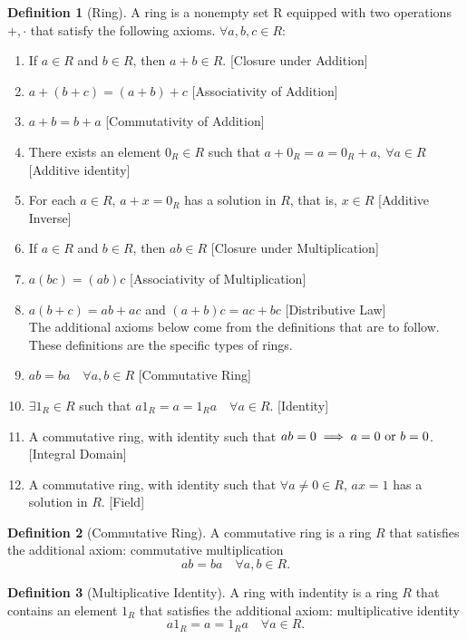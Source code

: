 \documentclass{article}
\theoremstyle{definition}
\newtheorem{definition}{Definition}[section]
\theoremstyle{remark}
\begin{document}
\begin{definition}[Ring]\label{def:ring}
A ring is a nonempty set R equipped with two operations \(+, \cdot\) that satisfy the following axioms. \(\forall a,b,c \in R\):
\begin{enumerate}
\item If \(a \in R\) and \(b \in R\), then \(a + b \in R\). \hfill [Closure under Addition]
\item \(a + (b+c) = (a+b)+c\) \hfill [Associativity of Addition]
\item \(a + b = b + a\) \hfill [Commutativity of Addition]
\item There exists an element \( 0_R \in R\) such that \(a + 0_R = a = 0_R + a, \ \forall a \in R\) \hfill [Additive identity]
\item For each \(a \in R\), \(a + x = 0_R\) has a solution in \(R\), that is, \(x \in R\) \hfill [Additive Inverse]
\item If \(a \in R\) and \(b \in R\), then \(ab \in R\) \hfill [Closure under Multiplication]
\item \(a(bc) = (ab)c\) \hfill [Associativity of Multiplication]
\item \( a(b+c) = ab + ac\) and \((a+b)c = ac + bc\) \hfill [Distributive Law] \\
The additional axioms below come from the definitions that are to follow. These definitions are the specific types of rings.
\item $ab = ba \quad \forall a,b \in R$ \hfill [Commutative Ring] 
\item $\exists 1_R \in R$ such that $a1_R = a = 1_Ra \quad \forall a \in R $. \hfill [Identity] 
\item A commutative ring, with identity such that $ab=0 \implies a= 0 \textnormal{ or } b=0$. \hfill [Integral Domain] 
\item A commutative ring, with identity such that $\forall a \neq 0 \in R$, $ax = 1$ has a solution in $R$. \hfill [Field] 
\end{enumerate}

\end{definition}


\begin{definition}[Commutative Ring]\label{def:commutative_ring}
A commutative ring is a ring \(R\) that satisfies the additional axiom: commutative multiplication
\[
ab = ba \quad \forall a,b \in R.
\]
\end{definition}

\begin{definition}[Multiplicative Identity] \label{def: multiplicative identity}
A ring with indentity is a ring \(R\) that contains an element \(1_R\) that satisfies the additional axiom: multiplicative identity
\[
a1_R = a = 1_R a \quad \forall a \in R.
\]
\end{definition}
\end{document}
